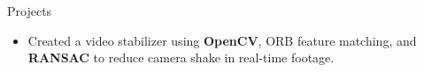 \documentclass{resume} %
\begin{document}
\begin{workSection}{Projects}
	\customItem[
	title=Video Stabilizer,
	duration=Solo | April 2025,
	]
	\begin{itemize}
		\vspace{-0.5em}
		\itemsep -6pt {}
		\item Created a video stabilizer using \textbf{OpenCV}, ORB feature matching, and \textbf{RANSAC} to reduce camera shake in real-time footage.
	\end{itemize}
	
	





\end{workSection}
\end{document}
